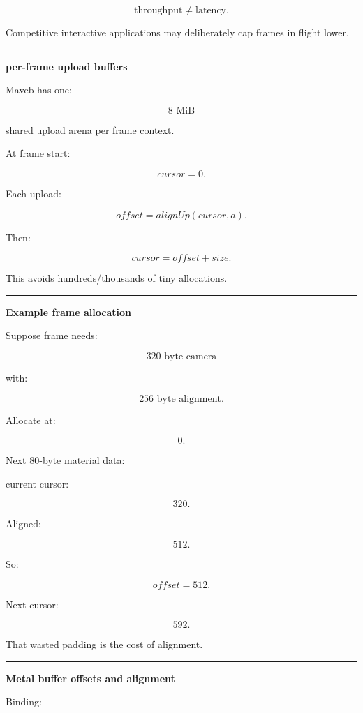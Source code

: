 \[
\boxed{
\text{throughput}
\neq
\text{latency}.
}
\]

Competitive interactive applications may deliberately cap frames in flight lower.

\begin{center}\rule{0.5\linewidth}{0.5pt}\end{center}

\textbf{per-frame upload buffers}

Maveb has one:

\[
8\text{ MiB}
\]

shared upload arena per frame context.

At frame start:

\[
cursor=0.
\]

Each upload:

\[
offset=
alignUp(cursor,a).
\]

Then:

\[
cursor=
offset+size.
\]

This avoids hundreds/thousands of tiny allocations.

\begin{center}\rule{0.5\linewidth}{0.5pt}\end{center}

\textbf{Example frame allocation}

Suppose frame needs:

\[
320\text{ byte camera}
\]

with:

\[
256\text{ byte alignment}.
\]

Allocate at:

\[
0.
\]

Next 80-byte material data:

current cursor:

\[
320.
\]

Aligned:

\[
512.
\]

So:

\[
offset=512.
\]

Next cursor:

\[
592.
\]

That wasted padding is the cost of alignment.

\begin{center}\rule{0.5\linewidth}{0.5pt}\end{center}

\textbf{Metal buffer offsets and alignment}

Binding:

